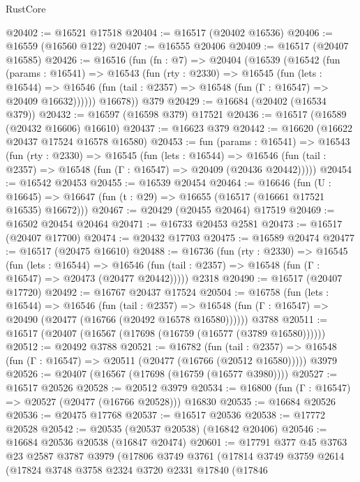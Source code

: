 \begin{lexlean}{RustCore}
\begin{coremodule}
@20402 := @16521 @17518
@20404 := @16517 (@20402 @16536)
@20406 := @16559 (@16560 @122)
@20407 := @16555 @20406
@20409 := @16517 (@20407 @16585)
@20426 := @16516
    (fun (fn : @7) =>
    @20404
      (@16539
        (@16542
          (fun (params : @16541) =>
          @16543
            (fun (rty : @2330) =>
            @16545
              (fun (lets : @16544) =>
              @16546 (fun (tail : @2357) => @16548 (fun (Γ : @16547) => @20409 @16632))))))
        @16678))
    @379
@20429 := @16684 (@20402 (@16534 @379))
@20432 := @16597 (@16598 @379) @17521
@20436 := @16517 (@16589 (@20432 @16606) @16610)
@20437 := @16623 @379
@20442 := @16620 (@16622 @20437 @17524 @16578 @16580)
@20453 := fun (params : @16541) =>
  @16543
    (fun (rty : @2330) =>
    @16545
      (fun (lets : @16544) =>
      @16546 (fun (tail : @2357) => @16548 (fun (Γ : @16547) => @20409 (@20436 @20442)))))
@20454 := @16542 @20453
@20455 := @16539 @20454
@20464 := @16646
    (fun (U : @16645) => @16647 (fun (t : @29) => @16655 (@16517 (@16661 @17521 @16535) @16672)))
@20467 := @20429 (@20455 @20464) @17519
@20469 := @16502 @20454 @20464
@20471 := @16733 @20453 @2581
@20473 := @16517 (@20407 @17700)
@20474 := @20432 @17703
@20475 := @16589 @20474
@20477 := @16517 (@20475 @16610)
@20488 := @16736
    (fun (rty : @2330) =>
    @16545
      (fun (lets : @16544) =>
      @16546 (fun (tail : @2357) => @16548 (fun (Γ : @16547) => @20473 (@20477 @20442)))))
    @2318
@20490 := @16517 (@20407 @17720)
@20492 := @16767 @20437 @17524
@20504 := @16758
    (fun (lets : @16544) =>
    @16546
      (fun (tail : @2357) =>
      @16548 (fun (Γ : @16547) => @20490 (@20477 (@16766 (@20492 @16578 @16580))))))
    @3788
@20511 := @16517 (@20407 (@16567 (@17698 (@16759 (@16577 (@3789 @16580))))))
@20512 := @20492 @3788
@20521 := @16782
    (fun (tail : @2357) => @16548 (fun (Γ : @16547) => @20511 (@20477 (@16766 (@20512 @16580)))))
    @3979
@20526 := @20407 (@16567 (@17698 (@16759 (@16577 @3980))))
@20527 := @16517 @20526
@20528 := @20512 @3979
@20534 := @16800 (fun (Γ : @16547) => @20527 (@20477 (@16766 @20528))) @16830
@20535 := @16684 @20526
@20536 := @20475 @17768
@20537 := @16517 @20536
@20538 := @17772 @20528
@20542 := @20535 (@20537 @20538) (@16842 @20406)
@20546 := @16684 @20536 @20538 (@16847 @20474)
@20601 := @17791
    @377
    @45
    @3763
    @23
    @2587
    @3787
    @3979
    (@17806
      @3749
      @3761
      (@17814
        @3749
        @3759
        @2614
        (@17824
          @3748
          @3758
          @2324
          @3720
          @2331
          @17840
          (@17846

\end{coremodule}
\end{lexlean}
